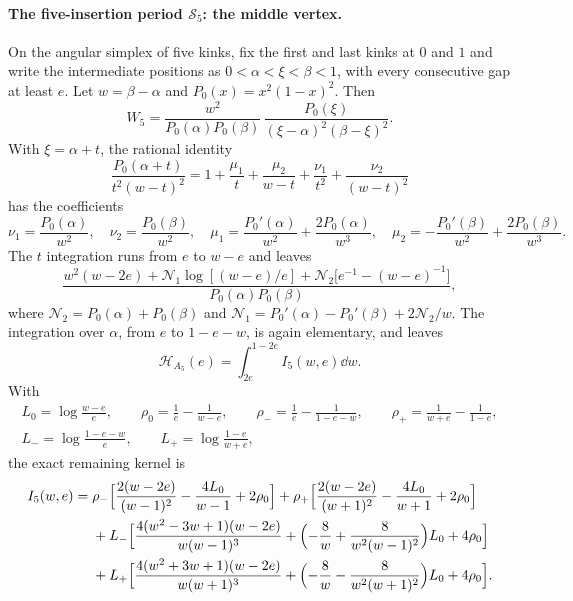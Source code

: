 \paragraph{The five-insertion period $\mathcal S_5$: the middle vertex.} On the angular simplex of five kinks, fix the
first and last kinks at $0$ and $1$ and write the intermediate positions as $0<\alpha<\xi<\beta<1$, with every
consecutive gap at least $e$. Let $w=\beta-\alpha$ and $P_0(x)=x^2(1-x)^2$. Then
\begin{equation}
 W_5=\frac{w^2}{P_0(\alpha)P_0(\beta)}\,\frac{P_0(\xi)}{(\xi-\alpha)^2(\beta-\xi)^2}.
\end{equation}
With $\xi=\alpha+t$, the rational identity
\begin{equation}
 \frac{P_0(\alpha+t)}{t^2(w-t)^2}=1+\frac{\mu_1}{t}+\frac{\mu_2}{w-t}+\frac{\nu_1}{t^2}+\frac{\nu_2}{(w-t)^2}
\end{equation}
has the coefficients
\begin{equation}
 \nu_1=\frac{P_0(\alpha)}{w^2},\quad \nu_2=\frac{P_0(\beta)}{w^2},\quad
 \mu_1=\frac{P_0'(\alpha)}{w^2}+\frac{2P_0(\alpha)}{w^3},\quad
 \mu_2=-\frac{P_0'(\beta)}{w^2}+\frac{2P_0(\beta)}{w^3}.
\end{equation}
The $t$ integration runs from $e$ to $w-e$ and leaves
\begin{equation}
 \frac{w^2(w-2e)+\mathcal N_1\log[(w-e)/e]+\mathcal N_2\bigl[e^{-1}-(w-e)^{-1}\bigr]}{P_0(\alpha)P_0(\beta)},
 \label{sri:eq:dualB:postcentral}
\end{equation}
where $\mathcal N_2=P_0(\alpha)+P_0(\beta)$ and $\mathcal N_1=P_0'(\alpha)-P_0'(\beta)+2\mathcal N_2/w$. The
integration over $\alpha$, from $e$ to $1-e-w$, is again elementary, and leaves
\begin{equation}
 \mathcal H_{A_5}(e)=\int_{2e}^{1-2e}I_5(w,e)\dd w.
\end{equation}
With
\begin{equation}
\begin{gathered}
 L_0=\log\frac{w-e}{e},\qquad \rho_0=\frac1e-\frac1{w-e},\qquad
 \rho_-=\frac1e-\frac1{1-e-w},\qquad \rho_+=\frac1{w+e}-\frac1{1-e},\\
 L_-=\log\frac{1-e-w}{e},\qquad L_+=\log\frac{1-e}{w+e},
\end{gathered}
\end{equation}
the exact remaining kernel is
\begin{equation}
\begin{aligned}
 I_5(w,e)={}&\rho_-\Bigl[\frac{2(w-2e)}{(w-1)^2}-\frac{4L_0}{w-1}+2\rho_0\Bigr]
 +\rho_+\Bigl[\frac{2(w-2e)}{(w+1)^2}-\frac{4L_0}{w+1}+2\rho_0\Bigr]\\
 &+L_-\Bigl[\frac{4(w^2-3w+1)(w-2e)}{w(w-1)^3}+\Bigl(-\frac8w+\frac8{w^2(w-1)^2}\Bigr)L_0+4\rho_0\Bigr]\\
 &+L_+\Bigl[\frac{4(w^2+3w+1)(w-2e)}{w(w+1)^3}+\Bigl(-\frac8w-\frac8{w^2(w+1)^2}\Bigr)L_0+4\rho_0\Bigr].
\end{aligned}
\label{sri:eq:dualB:I5}
\end{equation}
